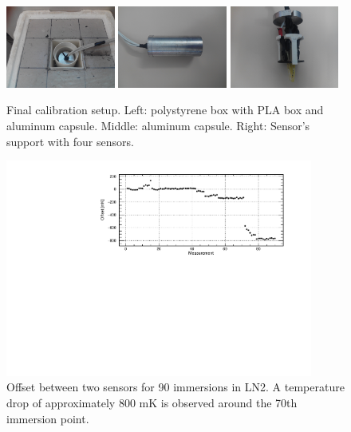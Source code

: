 \begin{figure}[htbp]
\centering
\includegraphics[width=0.32\textwidth]{./figure_4_a.jpg}
\includegraphics[width=0.32\textwidth]{./figure_4_b.jpg}
\includegraphics[width=0.32\textwidth]{./figure_4_c.jpg}
\caption{Final calibration setup. Left: polystyrene box with PLA box and aluminum capsule. Middle: aluminum capsule. Right: Sensor's support with four sensors.
\label{fig:setup_final}}
\end{figure}

\begin{figure}[htbp]
\centering
\includegraphics[width=0.9\textwidth]{./figure_5.pdf}
\caption{Offset between two sensors for 90 immersions in LN2. A temperature drop of approximately 800 mK is observed around the 70th immersion point.
\label{fig:broken_sensor_evolution}}
\end{figure}

